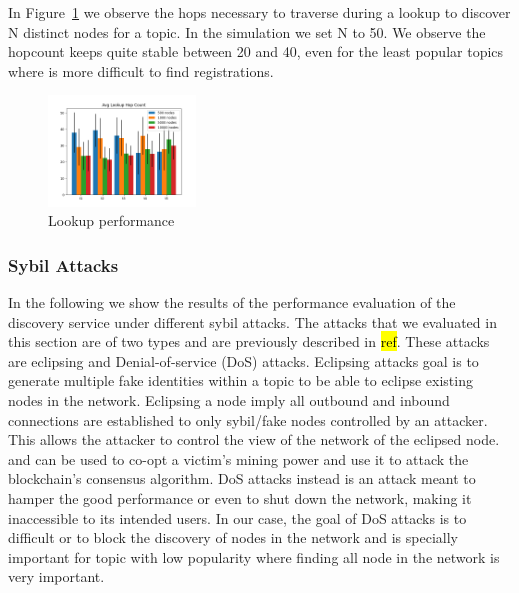 In Figure~\ref{fig:hopcount} we observe the hops necessary to traverse during a lookup to discover N distinct nodes for a topic.
In the simulation we set N to 50.
We observe the hopcount keeps quite stable between 20 and 40, even for the least popular topics where is more difficult to find registrations.


\begin{figure}[h!]
\centering
\includegraphics[width=0.35\textwidth]{img/eval/lookup_hopcount.png}
\caption{Lookup performance}
\label{fig:hopcount}
\vspace{-0.15in}
\end{figure}

\subsubsection{Sybil Attacks}


In the following we show the results of the performance evaluation of the discovery service under different sybil attacks.  The attacks that we evaluated in this section are of two types and are previously described in \hl{ref}. These attacks are eclipsing  and Denial-of-service (DoS) attacks.
Eclipsing attacks goal is to generate multiple fake identities within a topic to be able to eclipse existing nodes in the network.
Eclipsing a node imply all outbound and inbound connections are established to only sybil/fake nodes controlled by an attacker.
This allows the attacker to control the view of the network of the eclipsed node. and can be used to co-opt a victim's mining power and use it to attack the blockchain's consensus algorithm.
DoS attacks instead is an attack meant to hamper the good performance or even to shut down the network, making it inaccessible to its intended users.  
In our case,  the goal of DoS attacks is to difficult or to block the discovery of nodes in the network and is specially important for topic with low popularity where finding all node in the network is very important.

